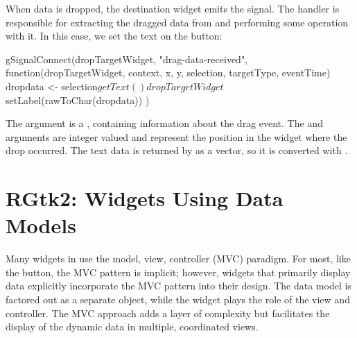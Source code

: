 When data is dropped, the destination widget emits the
 signal. The handler is responsible for
extracting the dragged data from  and performing some
operation with it. In this case, we set the text on the button:
\begin{Schunk}
\begin{Sinput}
 gSignalConnect(dropTargetWidget, "drag-data-received", 
                function(dropTargetWidget, context, x, y, selection, targetType,
                         eventTime) 
                {
                  dropdata <- selection$getText()
                  dropTargetWidget$setLabel(rawToChar(dropdata))
                })
\end{Sinput}
\end{Schunk}
%
The  argument is a , containing
information about the drag event. The  and  arguments
are integer valued and represent the position in the widget where the
drop occurred. The text data is returned by  as a
 vector, so it is converted with .



\chapter{RGtk2: Widgets Using Data Models}
\label{sec:RGtk2:widgets-with-models}



Many widgets in \GTK\/ use the model, view, controller (MVC)
paradigm. For most, like the button, the MVC pattern is implicit;
however, widgets that primarily display data explicitly incorporate
the MVC pattern into their design. The data model is factored out as a
separate object, while the widget plays the role of the view and
controller. The MVC approach adds a layer of complexity but
facilitates the display of the dynamic data in multiple, coordinated
views.


